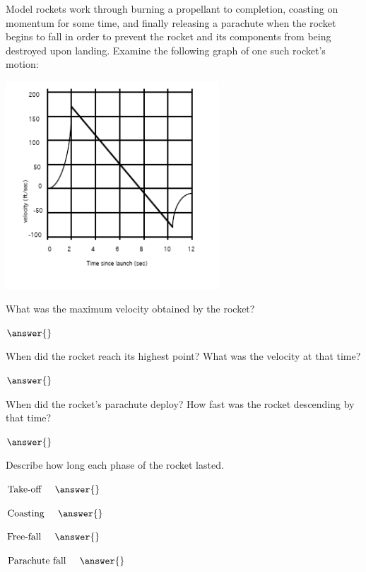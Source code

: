 \documentclass{ximera}
\begin{document}
\begin{question}
Model rockets work through burning a propellant to completion, coasting on momentum for some time, and finally releasing a parachute when the rocket begins to fall in order to prevent the rocket and its components from being destroyed upon landing. Examine the following graph of one such rocket's motion:
\begin{image}
    \includegraphics[width=80mm]{rocket.png}
\end{image}

What was the maximum velocity obtained by the rocket?

$\answer{}$

When did the rocket reach its highest point? What was the velocity at that time?

$\answer{}$

When did the rocket's parachute deploy? How fast was the rocket descending by that time?

$\answer{}$

Describe how long each phase of the rocket lasted.

$\text{Take-off} \hspace{5mm} \answer{}$

$\text{Coasting} \hspace{5mm} \answer{}$

$\text{Free-fall} \hspace{5mm} \answer{}$

$\text{Parachute fall} \hspace{5mm} \answer{}$
\end{question}
\end{document}
